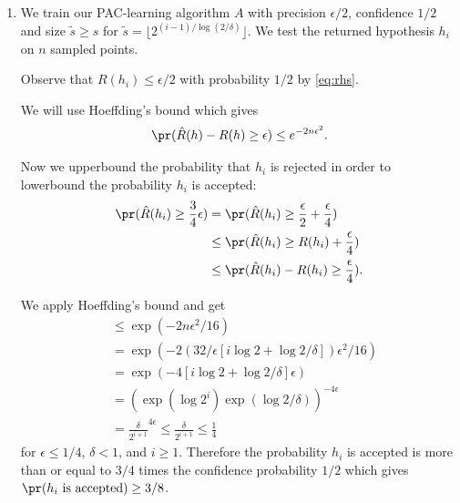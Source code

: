 \begin{enumerate}
\begin{enumerate}
        \item
        We train our PAC-learning algorithm $A$ with
        precision $\epsilon/2$, confidence $1/2$ and
        size $\tilde{s} \geq s$ for 
        $\tilde{s}=\lfloor 2^{(i-1)/\log(2/\delta)} \rfloor$.
        We test the returned hypothesis $h_i$ on
        $n$ sampled points.

        Observe that $R(h_i) \leq \epsilon/2$ with
        probability $1/2$ by \autoref{eq:rhs}.

        We will use Hoeffding's bound which gives
        \begin{align}
            \pr(\hat{R}(h)-R(h)\geq \epsilon)
            \leq e^{-2n\epsilon^2}.
            \nonumber
        \end{align}

        Now we upperbound the probability that $h_i$ is
        rejected in order to lowerbound the probability
        $h_i$ is accepted:
        \begin{align}
            \pr(\hat{R}(h_i) \geq \frac{3}{4}\epsilon)
            &= \pr(\hat{R}(h_i) \geq \frac{\epsilon}{2}
            + \frac{\epsilon}{4})
            \nonumber \\ 
            &\leq \pr(\hat{R}(h_i) \geq R(h_i) + \frac{\epsilon}{4})
            \nonumber \\ 
            &\leq \pr(\hat{R}(h_i)  - R(h_i) \geq \frac{\epsilon}{4}).
            \nonumber
        \end{align}

        We apply Hoeffding's bound and get
        \begin{align}
            & \leq \exp(-2n\epsilon^2/16) 
            \nonumber \\
            &= \exp(-2 (32/\epsilon [i \log 2 + \log 2/\delta])
            \epsilon^2/16)
            \nonumber \\
            &= \exp(-4 [i \log 2 + \log 2/\delta]\epsilon)
            \nonumber \\
            &= \left(\exp(\log2^i)\exp(\log2/\delta)\right)
            ^{-4\epsilon}
            \nonumber \\
            &= \frac{\delta}{2^{i+1}}^{4\epsilon}
            \leq \frac{\delta}{2^{i+1}} \leq \frac{1}{4}
            \nonumber
        \end{align}
        for $\epsilon \leq 1/4$, $\delta <1$, and
        $i \geq 1$.
        Therefore the probability $h_i$ is accepted
        is more than or equal to $3/4$ times the confidence probability
        $1/2$ which gives $\pr(h_i \textrm{ is accepted}) \geq 3/8$.


\end{enumerate}
\end{enumerate}
